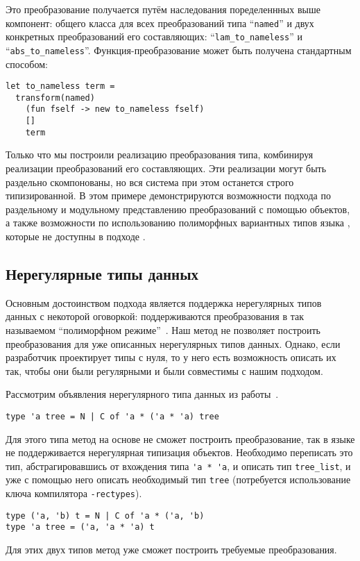 Это преобразование получается путём наследования поределеннных выше компонент: общего класса для всех преобразований типа ``\lstinline{named}'' 
и двух конкретных преобразований его составляющих: 
``\lstinline{lam_to_nameless}'' и ``\lstinline{abs_to_nameless}''.
Функция-преобразование может быть получена стандартным способом:

\begin{lstlisting}
let to_nameless term =
  transform(named) 
    (fun fself -> new to_nameless fself) 
    [] 
    term
\end{lstlisting}

Только что мы построили реализацию преобразования типа, комбинируя реализации преобразований его составляющих. Эти  реализации могут быть раздельно скомпонованы, но вся система при этом останется строго типизированной. В этом примере демонстрируются возможности подхода по раздельному и модульному представлению преобразований с помощью объектов, а также возможности по использованию полиморфных вариантных типов языка \ocaml{}, которые не доступны в подходе \visitors{}.

\subsection{Нерегулярные типы данных}
\label{sec:irregular}

Основным достоинством подхода \visitors{} является поддержка нерегулярных типов данных с некоторой оговоркой: поддерживаются преобразования в так называемом ``полиморфном режиме''~\cite{Visitors}. Наш метод не позволяет построить преобразования для уже описанных нерегулярных типов данных. Однако, если разработчик проектирует типы с нуля, то у него есть возможность описать их так, чтобы они были регулярными и были совместимы с нашим подходом. 

Рассмотрим объявления нерегулярного типа данных  из работы~\cite{irregular}.

\begin{lstlisting}
type 'a tree = N | C of 'a * ('a * 'a) tree
\end{lstlisting}
\noindent Для этого типа метод на основе \GT{} не сможет построить преобразование, так в языке \ocaml{} не поддерживается нерегулярная типизация объектов. Необходимо переписать это тип, абстрагировавшись от вхождения типа \lstinline{'a * 'a}, и описать тип \lstinline{tree_list}, и уже с помощью него описать  необходимый тип \lstinline{tree} (потребуется использование ключа компилятора \texttt{-rectypes}).
\begin{lstlisting}
type ('a, 'b) t = N | C of 'a * ('a, 'b)
type 'a tree = ('a, 'a * 'a) t 
\end{lstlisting}
\noindent Для этих двух типов метод уже сможет построить требуемые преобразования.

